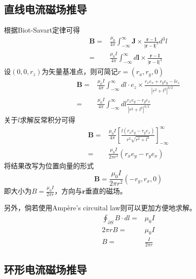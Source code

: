 \subsection{直线电流磁场推导}

根据Biot-Savart定律可得
\begin{align*}
    \mathbf{B}=&\frac{\mu_0}{4\pi}\int_{-\infty}^{\infty}\mathbf{J}\times\frac{\mathbf{r}-\mathbf{l}}{|\mathbf{r}-\mathbf{l}|^3}d^3l\\
    =&\frac{\mu_0I}{4\pi}\int_{-\infty}^{\infty}d\mathbf{l}\times\frac{\mathbf{r}-\mathbf{l}}{|\mathbf{r}-\mathbf{l}|^3}
\end{align*}
设$(0,0,r_z)$为矢量基准点，则可简记$r=(r_x,r_y,0)$
\begin{align*}
    \mathbf{B}=&\frac{\mu_0I}{4\pi}\int_{-\infty}^{\infty}dl\cdot e_z\times\frac{r_xe_x+r_ye_y-le_z}{|r^2+l^2|^{3/2}}\\
    =&\frac{\mu_0I}{4\pi}\int_{-\infty}^{\infty}dl\frac{r_xe_y-r_ye_x}{|r^2+l^2|^{3/2}}
\end{align*}
关于$l$求解反常积分可得
\begin{align*}
    \mathbf{B}=&\frac{\mu_0I}{4\pi}\left[\frac{l(r_xe_y-r_ye_x)}{r^2\sqrt{r^2+l^2}}\right]_{-\infty}^{\infty}\\
    =&\frac{\mu_0I}{2\pi r^2}(r_xe_y-r_ye_x)
\end{align*}
将结果改写为位置向量的形式
\begin{equation*}
    \mathbf{B}=\frac{\mu_0I}{2\pi r^2}(-r_y,r_x,0)
\end{equation*}
即大小为$B=\frac{\mu_0I}{2\pi r}$，方向与$\mathbf{r}$垂直的磁场。

另外，倘若使用Ampère's circuital law则可以更加方便地求解。
\begin{align*}
    \oint_{\partial S}B\cdot dl=&\mu_0I\\
    2\pi r B=&\mu_0I\\
    B=&\frac{I}{2\pi r}
\end{align*}

\subsection{环形电流磁场推导}

